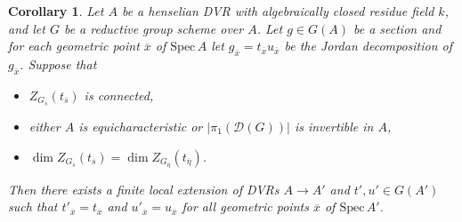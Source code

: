 \documentclass[11pt,reqno]{amsart}
\newtheorem{cor}[theorem]{Corollary}
\theoremstyle{definition}
\newcommand{\Spec}{\mathrm{Spec} \,}
\newcommand{\sD}{{\mathscr D}}
\begin{document}
\begin{cor}\label{corollary:relative-jordan-pure}
Let $A$ be a henselian DVR with algebraically closed residue field $k$, and let $G$ be a reductive group scheme over $A$. Let $g \in G(A)$ be a section and for each geometric point $\overline{x}$ of $\Spec A$ let $g_{\overline{x}} = t_{\overline{x}} u_{\overline{x}}$ be the Jordan decomposition of $g_{\overline{x}}$. Suppose that
\begin{itemize}
    \item $Z_{G_{\overline{s}}}(t_{\overline{s}})$ is connected,
    \item either $A$ is equicharacteristic or $|\pi_1(\sD(G))|$ is invertible in $A$,
    \item $\dim Z_{G_{\overline{s}}}(t_{\overline{s}}) = \dim Z_{G_{\overline{\eta}}}(t_{\overline{\eta}})$.
\end{itemize}
Then there exists a finite local extension of DVRs $A \to A'$ and $t', u' \in G(A')$ such that $t'_{\overline{x}} = t_{\overline{x}}$ and $u'_{\overline{x}} = u_{\overline{x}}$ for all geometric points $\overline{x}$ of $\Spec A'$.
\end{cor}
\end{document}
